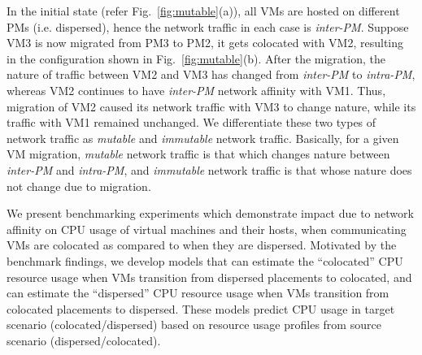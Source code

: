 In the initial state (refer Fig.~\ref{fig:mutable}(a)), all VMs are
hosted on different PMs (i.e. dispersed), hence the network traffic
in each case is \textit{inter-PM}. Suppose VM3 is now migrated from
PM3 to PM2, it gets colocated with VM2, resulting in the 
configuration shown in Fig.~\ref{fig:mutable}(b). 
After the migration, the nature of traffic between VM2 and VM3
has changed from \textit{inter-PM} to \textit{intra-PM}, whereas VM2
continues to have \textit{inter-PM} network affinity with VM1.
Thus, migration of VM2 caused its network traffic with VM3 to 
change nature, while its traffic with VM1 remained unchanged. We differentiate
these two types of network traffic as \textit{mutable} and \textit{immutable}
network traffic.
Basically, for a given VM migration, \textit{mutable} network traffic 
is that which changes nature between \textit{inter-PM} and \textit{intra-PM},
and \textit{immutable} network traffic is that whose nature does not change
due to migration.

We present benchmarking experiments
which demonstrate impact due to network affinity
on CPU usage of virtual machines and their hosts, when communicating
VMs are colocated as compared to when they are dispersed. 
Motivated by the benchmark findings, we develop models
that can estimate the ``colocated'' CPU resource usage when VMs transition
from dispersed placements to colocated, and can estimate the ``dispersed''
CPU resource usage when VMs transition from colocated placements to dispersed. 
These models predict CPU usage in target
scenario (colocated/dispersed) based on resource usage profiles
from source scenario (dispersed/colocated).

